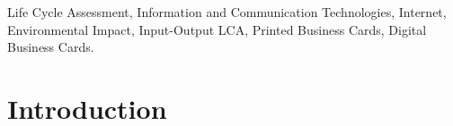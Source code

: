 \documentclass[conference]{IEEEtran}
\begin{document}
\begin{abstract}

\end{abstract}

\begin{IEEEkeywords}
Life Cycle Assessment, Information and Communication Technologies, Internet, Environmental Impact, Input-Output LCA, Printed Business Cards, Digital Business Cards. 
\end{IEEEkeywords}


%
\IEEEpeerreviewmaketitle


\section{Introduction}
\end{document}
